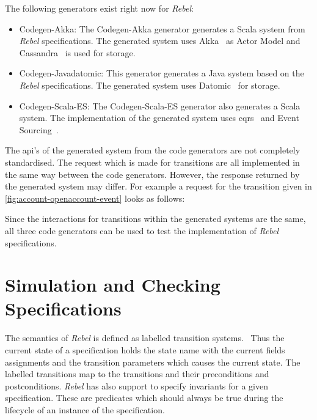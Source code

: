 The following generators exist right now for \textit{Rebel}:
\begin{itemize}

\item Codegen-Akka: The Codegen-Akka generator generates a Scala system from
\textit{Rebel} specifications. The generated system uses
Akka~\cite[p.~4]{roestenburg2016akka} as Actor Model and
Cassandra~\cite{lakshman2010cassandra} is used for storage.

\item Codegen-Javadatomic: This generator generates a Java system based on the
\textit{Rebel} specifications. The generated system uses
Datomic~\cite[p.~170-172]{anderson2016professional} for storage.

\item Codegen-Scala-ES: The Codegen-Scala-ES generator also generates a Scala
system. The implementation of the generated system uses
\gls{cqrs}~\cite{fowler2011cqrs} and Event Sourcing~\cite{fowler2005event}.

\end{itemize}

The \gls{api}'s of the generated system from the code generators are not completely
standardised. The request which is made for transitions are all implemented in
the same way between the code generators. However, the response returned by the
generated system may differ. For example a request for the transition given in
\autoref{fig:account-openaccount-event} looks as follows:

\begin{center}
\end{center}

Since the interactions for transitions within the generated systems are the
same, all three code generators can be used to test the implementation of
\textit{Rebel} specifications.

\clearpage

\section{Simulation and Checking Specifications}

The semantics of \textit{Rebel} is defined as labelled transition
systems.~\cite[p.~5]{stoel_storm_vinju_bosman_2016} Thus the current state of a
specification holds the state name with the current fields assignments and the
transition parameters which causes the current state. The labelled transitions map
to the transitions and their preconditions and postconditions. \textit{Rebel} has
also support to specify invariants for a given specification. These are
predicates which should always be true during the lifecycle of an instance of
the specification.

